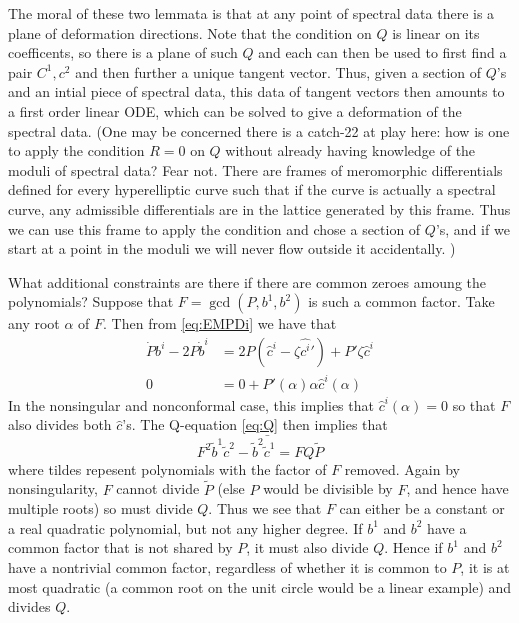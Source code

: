 






The moral of these two lemmata is that at any point of spectral data there is a plane of deformation directions. Note that the condition on $Q$ is linear on its coefficents, so there is a plane of such $Q$ and each can then be used to first find a pair $C^1,c^2$ and then further a unique tangent vector. Thus, given a section of $Q$'s and an intial piece of spectral data, this data of tangent vectors then amounts to a first order linear ODE, which can be solved to give a deformation of the spectral data. (One may be concerned there is a catch-22 at play here: how is one to apply the condition $R=0$ on $Q$ without already having knowledge of the moduli of spectral data? Fear not. There are frames of meromorphic differentials defined for every hyperelliptic curve such that if the curve is actually a spectral curve, any admissible differentials are in the lattice generated by this frame. Thus we can use this frame to apply the condition and chose a section of $Q$'s, and if we start at a point in the moduli we will never flow outside it accidentally. )






What additional constraints are there if there are common zeroes amoung the polynomials? Suppose that $F = \gcd(P,b^1,b^2)$ is such a common factor. Take any root $α$ of $F$. Then from \eqref{eq:EMPDi} we have that
\begin{align}
\dot P b^i - 2P\dot b^i &= 2P\left( \hat c^i - \zeta\hat {c^i}'\right) + P'\zeta\hat c^i \\
0 &= 0 + P'(α)α\hat c^i(α)
\end{align}
In the nonsingular and nonconformal case, this implies that $\hat c^i(α) = 0$ so that $F$ also divides both $\hat c$'s. The Q-equation \eqref{eq:Q} then implies that
\[
F^2 \bar{\tilde{b}^1\tilde{c}^2 - \tilde{b}^2\tilde{c}^1 = F Q \tilde{P}}
\]
where tildes repesent polynomials with the factor of $F$ removed. Again by nonsingularity, $F$ cannot divide $\tilde{P}$ (else $P$ would be divisible by $F$, and hence have multiple roots) so must divide $Q$. Thus we see that $F$ can either be a constant or a real quadratic polynomial, but not any higher degree. If $b^1$ and $b^2$ have a common factor that is not shared by $P$, it must also divide $Q$. Hence if $b^1$ and $b^2$ have a nontrivial common factor, regardless of whether it is common to $P$, it is at most quadratic (a common root on the unit circle would be a linear example) and divides $Q$.














